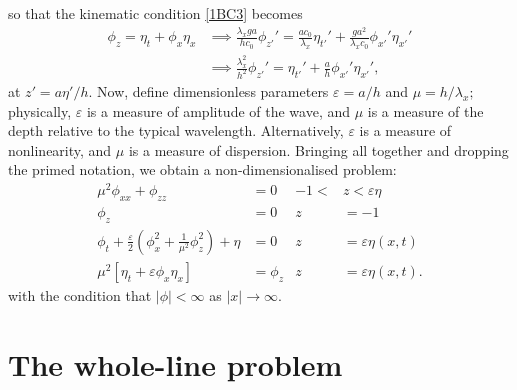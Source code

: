 \documentclass[10pt,reqno,oneside,a4paper]{article}
\begin{document}
so that the kinematic condition \eqref{1BC3} becomes
\begin{align*}
\phi_z = \eta_t + \phi_x\eta_x &\implies \frac{\lambda_x ga}{h c_0} \phi_{z'}'=\frac{ac_0}{\lambda_x}\eta_{t'}' + \frac{ga^2}{\lambda_xc_0} \phi_{x'}' \eta_{x'}' \\
&\implies \frac{\lambda_x^2}{h^2} \phi_{z'}'= \eta_{t'}' + \frac{a}{h} \phi_{x'}' \eta_{x'}',
\end{align*}
at $z' = a\eta'/h.$ Now, define dimensionless parameters $\varepsilon = a/h$ and $\mu = h/\lambda_x;$ physically, $\varepsilon$ is a measure of amplitude of the wave, and $\mu$ is a measure of the depth relative to the typical wavelength. Alternatively, $\varepsilon$ is a measure of nonlinearity, and $\mu$ is a measure of dispersion. Bringing all together and dropping the primed notation, we obtain a non-dimensionalised problem:
\begin{subequations}\label{WLP1DND1}
\begin{align}
\label{1PDEND1}  \mu^2 \phi_{xx} + \phi_{zz} &= 0 &-1 <&z < \varepsilon\eta \\
\label{1BC1ND1} \phi_z &= 0 &z &= -1  \\ 
\label{1BC2ND1} \phi_{t} + \frac{\varepsilon}{2} \left(\phi_{x}^2 + \frac{1}{\mu^2}\phi_{z}^2\right) + \eta &= 0 &z &= \varepsilon\eta(x,t)\\
\label{1BC3ND1} \mu^2 \left[\eta_{t} + \varepsilon \phi_{x} \eta_{x}\right] &= \phi_{z} &z &= \varepsilon\eta(x,t).
\end{align}
\end{subequations}
with the condition that $|\phi| < \infty$ as $|x|\to \infty.$

\section{The whole-line problem}
\end{document}
